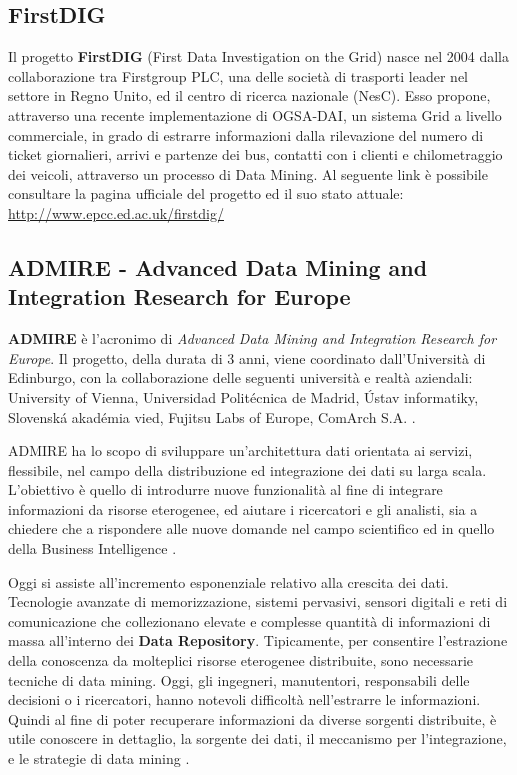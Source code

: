 \documentclass[11pt]{article}
\begin{document}
\subsection{FirstDIG}

Il progetto \textbf{FirstDIG} (First Data Investigation on the Grid) nasce nel 2004 dalla collaborazione tra Firstgroup PLC, una delle società di trasporti leader nel settore in Regno Unito, ed il centro di ricerca nazionale (NesC). Esso propone, attraverso una recente implementazione di OGSA-DAI, un sistema Grid a livello commerciale, in grado di estrarre informazioni dalla rilevazione del numero di ticket giornalieri, arrivi e partenze dei bus, contatti con i clienti e chilometraggio dei veicoli, attraverso un processo di Data Mining. Al seguente link è possibile consultare la pagina ufficiale del progetto ed il suo stato attuale: \url{http://www.epcc.ed.ac.uk/firstdig/} \cite{Sloan_firstdata}

\subsection{ADMIRE - Advanced Data Mining and Integration Research for Europe}

\textbf{ADMIRE} è l'acronimo di \emph{Advanced Data Mining and Integration Research for Europe}. Il progetto, della durata di 3 anni, viene coordinato dall'Università di Edinburgo, con la collaborazione delle seguenti università e realtà aziendali: University of Vienna, Universidad Politécnica de Madrid, Ústav informatiky, Slovenská akadémia vied, Fujitsu Labs of Europe, ComArch S.A. \cite{6020018}.

ADMIRE ha lo scopo di sviluppare un'architettura dati orientata ai servizi, flessibile, nel campo della distribuzione ed integrazione dei dati su larga scala. L'obiettivo è quello di introdurre nuove funzionalità al fine di integrare informazioni da risorse eterogenee, ed aiutare i ricercatori e gli analisti, sia a chiedere che a rispondere alle nuove domande nel campo scientifico ed in quello della Business Intelligence \cite{6020018}.

Oggi si assiste all'incremento esponenziale relativo alla crescita dei dati. Tecnologie avanzate di memorizzazione, sistemi pervasivi, sensori digitali e reti di comunicazione che collezionano elevate e complesse quantità di informazioni di massa all'interno dei \textbf{Data Repository}. Tipicamente, per consentire l'estrazione della conoscenza da molteplici risorse eterogenee distribuite, sono necessarie tecniche di data mining. Oggi, gli ingegneri, manutentori, responsabili delle decisioni o i ricercatori, hanno notevoli difficoltà nell'estrarre le informazioni. Quindi al fine di poter recuperare informazioni da diverse sorgenti distribuite, è utile conoscere in dettaglio, la sorgente dei dati, il meccanismo per l'integrazione, e le strategie di data mining \cite{6020018}.
\end{document}
